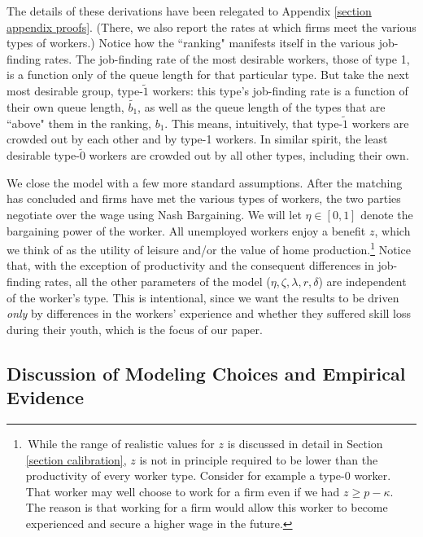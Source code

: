 \documentclass[12pt]{article} %
\theoremstyle{definition}
\begin{document}
The details of these derivations have been relegated to Appendix \ref{section appendix proofs}. (There, we also report the rates at which firms meet the various types of workers.) Notice how the ``ranking" manifests itself in the various job-finding rates. The job-finding rate of the most desirable workers, those of type 1, is a function only of the queue length for that particular type. But take the next most desirable group, type-$\tilde{1}$ workers: this type's job-finding rate is a function of their own queue length, $\tilde{b_1}$, as well as the queue length of the types that are ``above" them in the ranking, $b_1$. This means, intuitively, that type-$\tilde{1}$ workers are crowded out by each other and by type-1 workers. In similar spirit, the least desirable type-$\tilde{0}$ workers are crowded out by all other types, including their own. 


We close the model with a few more standard assumptions. After the matching has concluded and firms have met the various types of workers, the two parties negotiate over the wage using Nash Bargaining. We will let $\eta\in[0,1]$ denote the bargaining power of the worker. All unemployed workers enjoy a benefit $z$, which we think of as the utility of leisure and/or the value of home production.\footnote{\,While the range of realistic values for $z$ is discussed in detail in Section \ref{section calibration}, $z$ is not in principle required to be lower than the productivity of every worker type. Consider for example a type-0 worker. That worker may well choose to work for a firm even if we had $z \geq  p-\kappa$. The reason is that working for a firm would allow this worker to become experienced and secure a higher wage in the future. %
} Notice that, with the exception of productivity and the consequent differences in job-finding rates, all the other parameters of the model ($\eta, \zeta, \lambda, r,\delta$) are independent of the worker's type. This is intentional, since we want the results to be driven \textit{only} by differences in the workers' experience and whether they suffered skill loss during their youth, which is the focus of our paper.   


\subsection{Discussion of Modeling Choices and Empirical Evidence}\label{section model discussion}
\end{document}
